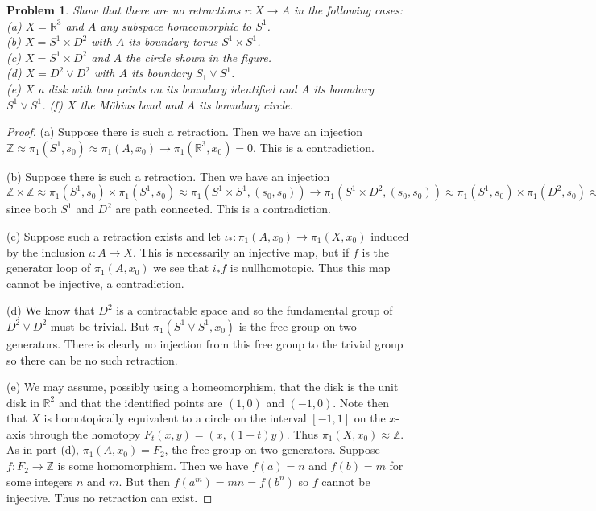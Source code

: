 \documentclass{article}
\newtheorem{problem}{Problem}
\begin{document}
\begin{problem}
Show that there are no retractions $r : X \to A$  in the following cases:
(a) $X = \mathbb{R}^3$ and $A$ any subspace homeomorphic to $S^1$.\\
(b) $X = S^1 \times D^2$ with $A$ its boundary torus $S^1 \times S^1$.\\
(c) $X = S^1 \times D^2$ and $A$ the circle shown in the figure.\\
(d) $X = D^2 \vee D^2$ with $A$ its boundary $S_1 \vee S^1$.\\
(e) $X$ a disk with two points on its boundary identified and $A$ its boundary $S^1 \vee S^1$.
(f) $X$ the M\"{o}bius band and $A$ its boundary circle.
\end{problem}
\begin{proof}
(a) Suppose there is such a retraction. Then we have an injection $\mathbb{Z} \approx \pi_1(S^1,s_0) \approx \pi_1(A,x_0) \to \pi_1(\mathbb{R}^3,x_0) = 0$. This is a contradiction.

(b) Suppose there is such a retraction. Then we have an injection $\mathbb{Z} \times \mathbb{Z} \approx \pi_1(S^1,s_0) \times \pi_1(S^1,s_0) \approx \pi_1(S^1 \times S^1,(s_0,s_0)) \to \pi_1(S^1 \times D^2,(s_0,s_0)) \approx \pi_1(S^1,s_0) \times \pi_1(D^2,s_0) \approx \mathbb{Z} \times 0 = \mathbb{Z}$ since both $S^1$ and $D^2$ are path connected. This is a contradiction.

(c) Suppose such a retraction exists and let $\iota_* : \pi_1(A,x_0) \to \pi_1(X,x_0)$ induced by the inclusion $\iota : A \to X$. This is necessarily an injective map, but if $f$ is the generator loop of $\pi_1(A,x_0)$ we see that $i_*f$ is nullhomotopic. Thus this map cannot be injective, a contradiction.

(d) We know that $D^2$ is a contractable space and so the fundamental group  of $D^2 \vee D^2$ must be trivial. But $\pi_1(S^1 \vee S^1, x_0)$ is the free group on two generators. There is clearly no injection from this free group to the trivial group so there can be no such retraction.

(e) We may assume, possibly using a homeomorphism, that the disk is the unit disk in $\mathbb{R}^2$ and that the identified points are $(1,0)$ and $(-1,0)$. Note then that $X$ is homotopically equivalent to a circle on the interval $[-1,1]$ on the $x$-axis through the homotopy $F_t(x,y) = (x,(1-t)y)$. Thus $\pi_1(X,x_0) \approx \mathbb{Z}$. As in part (d), $\pi_1(A,x_0) = F_2$, the free group on two generators. Suppose $f : F_2 \to \mathbb{Z}$ is some homomorphism. Then we have $f(a) = n$ and $f(b) = m$ for some integers $n$ and $m$. But then $f(a^m) = mn = f(b^n)$ so $f$ cannot be injective. Thus no retraction can exist.


\end{proof}
\end{document}
